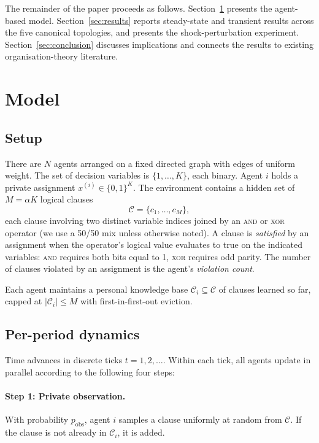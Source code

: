 \documentclass{article}
\begin{document}
The remainder of the paper proceeds as follows. Section~\ref{sec:model} presents the agent-based model. Section~\ref{sec:results} reports steady-state and transient results across the five canonical topologies, and presents the shock-perturbation experiment. Section~\ref{sec:conclusion} discusses implications and connects the results to existing organisation-theory literature.


\section{Model}\label{sec:model}

\subsection{Setup}

There are $N$ agents arranged on a fixed directed graph with edges of uniform weight. The set of decision variables is $\{1, \dots, K\}$, each binary. Agent $i$ holds a private assignment $x^{(i)}\in\{0,1\}^K$. The environment contains a hidden set of $M=\alpha K$ logical clauses
$$
\mathcal{C} = \{c_1, \dots, c_M\},
$$
each clause involving two distinct variable indices joined by an \textsc{and} or \textsc{xor} operator (we use a 50/50 mix unless otherwise noted). A clause is \emph{satisfied} by an assignment when the operator's logical value evaluates to true on the indicated variables: \textsc{and} requires both bits equal to 1, \textsc{xor} requires odd parity. The number of clauses violated by an assignment is the agent's \emph{violation count}.

Each agent maintains a personal knowledge base $\mathcal{C}_i \subseteq \mathcal{C}$ of clauses learned so far, capped at $|\mathcal{C}_i| \leq M$ with first-in-first-out eviction.

\subsection{Per-period dynamics}

Time advances in discrete ticks $t = 1, 2, \dots$. Within each tick, all agents update in parallel according to the following four steps:

\paragraph{Step 1: Private observation.} With probability $p_{\text{obs}}$, agent $i$ samples a clause uniformly at random from $\mathcal{C}$. If the clause is not already in $\mathcal{C}_i$, it is added.
\end{document}

